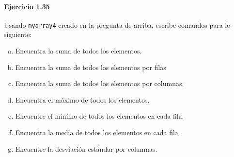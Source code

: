 \paragraph{\color{DarkBlue}Ejercicio 1.35}
Usando \texttt{myarray4} creado en la pregunta de arriba,
escribe comandos para lo siguiente:
\begin{enumerate}[(a)]
	\item

	      Encuentra la suma de todos los elementos.

	\item

	      Encuentra la suma de todos los elementos por filas

	\item

	      Encuentra la suma de todos los elementos por columnas.

	\item

	      Encuentra el máximo de todos los elementos.

	\item

	      Encuentre el mínimo de todos los elementos en cada fila.

	\item

	      Encuentra la media de todos los elementos en cada fila.

	\item

	      Encuentre la desviación estándar por columnas.
\end{enumerate}
